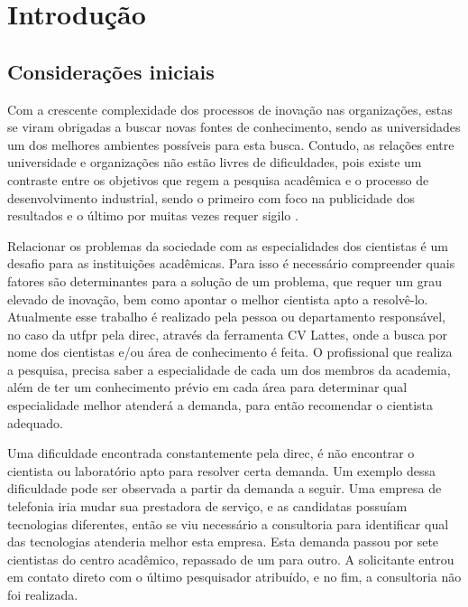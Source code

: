 \chapter{Introdução}\label{cap:introducao}

\section{Considerações iniciais}\label{sec:consideracoesIniciais}

Com a crescente complexidade dos processos de inovação nas organizações, estas se viram obrigadas a buscar novas fontes de conhecimento, sendo as universidades um dos melhores ambientes possíveis para esta busca. Contudo, as relações entre universidade e organizações não estão livres de dificuldades, pois existe um contraste entre os objetivos que regem a pesquisa acadêmica e o processo de desenvolvimento industrial, sendo o primeiro com foco na publicidade dos resultados e o último por muitas vezes requer sigilo \cite{UnicampIE}. 

Relacionar os problemas da sociedade com as especialidades dos cientistas é um desafio para as instituições acadêmicas. Para isso é necessário compreender quais fatores são determinantes para a solução de um problema, que requer um grau elevado de inovação, bem como apontar o melhor cientista apto a resolvê-lo. Atualmente esse trabalho é realizado pela pessoa ou departamento responsável, no caso da \gls{utfpr} pela \gls{direc}, através da ferramenta CV Lattes, onde a busca por nome dos cientistas e/ou área de conhecimento é feita. O profissional que realiza a pesquisa, precisa saber a especialidade de cada um dos membros da academia, além de ter um conhecimento prévio em cada área para determinar qual especialidade melhor atenderá a demanda, para então recomendar o cientista adequado.

Uma dificuldade encontrada constantemente pela \gls{direc}, é não encontrar o cientista ou laboratório apto para resolver certa demanda. Um exemplo dessa dificuldade pode ser observada a partir da demanda a seguir. Uma empresa de telefonia iria mudar sua prestadora de serviço, e as candidatas possuíam tecnologias diferentes, então se viu necessário a consultoria para identificar qual das tecnologias atenderia melhor esta empresa. Esta demanda passou por sete cientistas do centro acadêmico, repassado de um para outro. A solicitante entrou em contato direto com o último pesquisador atribuído, e no fim, a consultoria não foi realizada.

